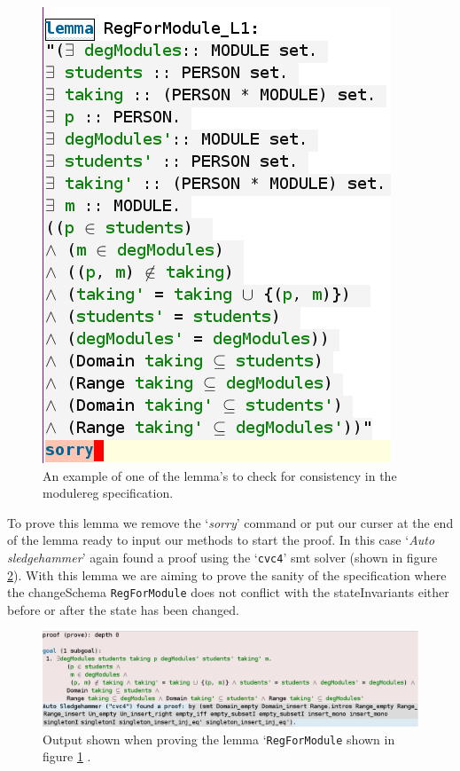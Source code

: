 \begin{figure}[H]
\centering
\includegraphics[scale=0.5]{Figures/Evaluation/lemmaformodulereg.png}
\caption{An example of one of the lemma's to check for consistency in the modulereg specification. \label{fig:modulereglemma1}}
\end{figure}

To prove this lemma we remove the `\emph{sorry}' command or put our curser at
the end of the lemma ready to input our methods to start the proof. In this case
`\emph{Auto sledgehammer}' again found a proof using the `\texttt{cvc4}'
\gls{smt} solver (shown in figure \ref{fig:autosolvermodulereg}). With this
lemma we are aiming to prove the sanity of the specification where the
changeSchema \verb|RegForModule| does not conflict with the stateInvariants
either before or after the state has been changed.

\begin{figure}[H]
\centering
\includegraphics[scale=0.35]{Figures/Evaluation/moduleregproof.png}
\caption{Output shown when proving the lemma `\texttt{RegForModule} shown in figure \ref{fig:modulereglemma1} . \label{fig:autosolvermodulereg}}
\end{figure}

